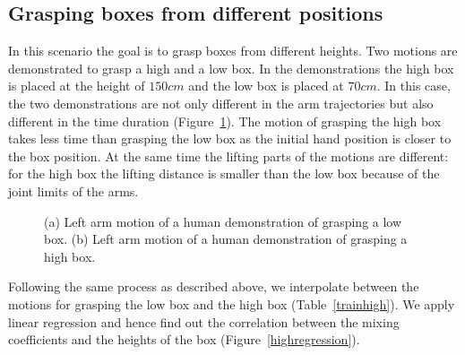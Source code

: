 \subsection{Grasping boxes from different positions}
\label{sbsec:diffheight}
In this scenario the goal is to grasp boxes from different heights. Two motions are demonstrated to grasp a high and a low box. In the demonstrations the high box is placed at the height of $150 cm$ and the low box is placed at $70 cm$. In this case, the two demonstrations are not only different in the arm trajectories but also different in the time duration (Figure~\ref{highlowjoint}). The motion of grasping the high box takes less time than grasping the low box as the initial hand position is closer to the box position. At the same time the lifting parts of the motions are different: for the high box the lifting distance is smaller than the low box because of the joint limits of the arms.

\begin{figure}
    \centering
    \caption{ \scriptsize{(a) Left arm motion of a human demonstration of grasping a low box. (b) Left arm motion of a human demonstration of grasping a high box.}}
\label{highlowjoint}
\end{figure}
Following the same process as described above, we interpolate between the motions for grasping the low box and the high box (Table~\ref{trainhigh}). We apply linear regression and hence find out the correlation between the mixing coefficients and the heights of the box (Figure~\ref{highregression}).

